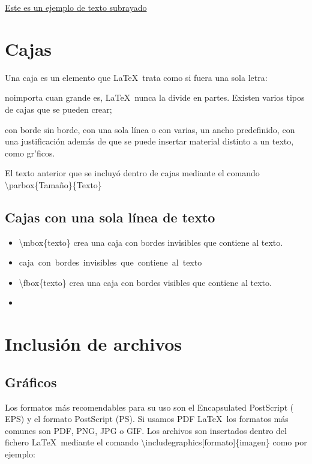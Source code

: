 \documentclass{article}
\begin{document}
\underline{Este es un ejemplo de texto subrayado}


\section{Cajas}
\parbox{0.3\textwidth}{Una caja es un elemento que \LaTeX\ trata como si fuera una sola letra:}

\parbox{0.7\textwidth}{noimporta cuan grande es, \LaTeX\ nunca la divide en partes. Existen varios tipos de cajas que se pueden crear;}

\parbox{\textwidth}{con borde sin borde, con una sola l\'inea o con varias, un ancho predefinido, con una justificaci\'on adem\'as de que se puede insertar material distinto a un texto, como gr\a'ficos.}

\medskip
El texto anterior que se incluy\'o dentro de cajas mediante el comando
\textbackslash parbox\{Tama\~no\}\{Texto\}

\subsection{Cajas con una sola l\'inea de texto} 
\begin{itemize}
\item \textbackslash mbox\{texto\} crea una caja con bordes invisibles que contiene al texto. 
\item \mbox{caja con bordes invisibles que contiene al texto} 
\item \textbackslash fbox\{texto\} crea una caja con bordes visibles que contiene al texto. 
\item {}
\end{itemize}

\section{Inclusi\'on de archivos} 
\subsection{Gr\'aficos} 
Los formatos m\'as recomendables para su uso son el Encapsulated PostScript ( EPS) y el formato PostScript (PS). Si usamos PDF \LaTeX\, los formatos m\'as comunes son PDF, PNG, JPG o GIF. Los archivos son insertados dentro del fichero \LaTeX\ mediante el comando \textbackslash includegraphics[formato]\{imagen\} 
como por ejemplo:
\end{document}

